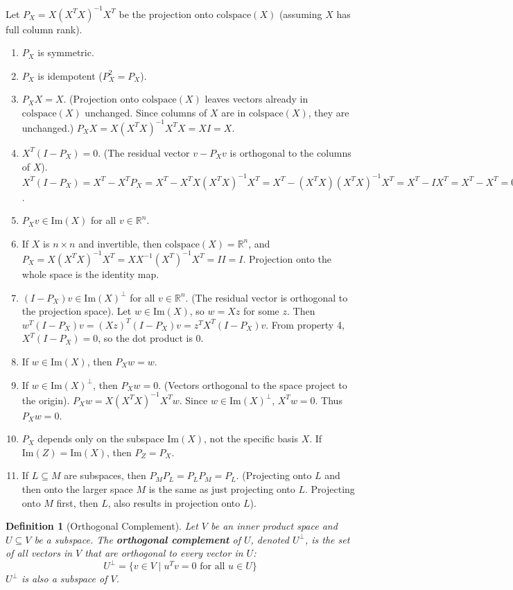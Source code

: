 \documentclass[11pt, a4paper]{article}
\theoremstyle{mydefinitionstyle}
\newtheorem{definition}{Definition}[section]
\theoremstyle{mytheoremstyle}
\newcommand{\R}{\mathbb{R}}
\newcommand{\colspace}{\text{colspace}}
\newcommand{\im}{\text{Im}} %
\begin{document}
Let $P_X = X(X^TX)^{-1}X^T$ be the projection onto $\colspace(X)$ (assuming $X$ has full column rank).
\begin{enumerate}
    \item $P_X$ is symmetric.
    \item $P_X$ is idempotent ($P_X^2 = P_X$).
    \item $P_X X = X$. (Projection onto $\colspace(X)$ leaves vectors already in $\colspace(X)$ unchanged. Since columns of $X$ are in $\colspace(X)$, they are unchanged.) $P_X X = X(X^T X)^{-1} X^T X = X I = X$.
    \item $X^T (I - P_X) = 0$. (The residual vector $v - P_X v$ is orthogonal to the columns of $X$). $X^T(I - P_X) = X^T - X^T P_X = X^T - X^T X(X^T X)^{-1} X^T = X^T - (X^T X)(X^T X)^{-1} X^T = X^T - I X^T = X^T - X^T = 0$.
    \item $P_X v \in \im(X)$ for all $v \in \R^n$.
    \item If $X$ is $n \times n$ and invertible, then $\colspace(X) = \R^n$, and $P_X = X(X^T X)^{-1} X^T = X X^{-1} (X^T)^{-1} X^T = I I = I$. Projection onto the whole space is the identity map.
    \item $(I - P_X)v \in \im(X)^{\perp}$ for all $v \in \R^n$. (The residual vector is orthogonal to the projection space). Let $w \in \im(X)$, so $w = Xz$ for some $z$. Then $w^T (I - P_X)v = (Xz)^T (I - P_X)v = z^T X^T (I - P_X) v$. From property 4, $X^T(I-P_X) = 0$, so the dot product is 0.
    \item If $w \in \im(X)$, then $P_X w = w$.
    \item If $w \in \im(X)^{\perp}$, then $P_X w = 0$. (Vectors orthogonal to the space project to the origin). $P_X w = X(X^T X)^{-1} X^T w$. Since $w \in \im(X)^{\perp}$, $X^T w = 0$. Thus $P_X w = 0$.
    \item $P_X$ depends only on the subspace $\im(X)$, not the specific basis $X$. If $\im(Z) = \im(X)$, then $P_Z = P_X$.
    \item If $L \subseteq M$ are subspaces, then $P_M P_L = P_L P_M = P_L$. (Projecting onto $L$ and then onto the larger space $M$ is the same as just projecting onto $L$. Projecting onto $M$ first, then $L$, also results in projection onto $L$).
\end{enumerate}

\begin{definition}[Orthogonal Complement] \label{def:orth_complement}
    Let $V$ be an inner product space and $U \subseteq V$ be a subspace. The \textbf{orthogonal complement} of $U$, denoted $U^\perp$, is the set of all vectors in $V$ that are orthogonal to every vector in $U$:
    \[ U^\perp = \{ v \in V \mid u^T v = 0 \text{ for all } u \in U \} \]
    $U^\perp$ is also a subspace of $V$.
\end{definition}
\end{document}
